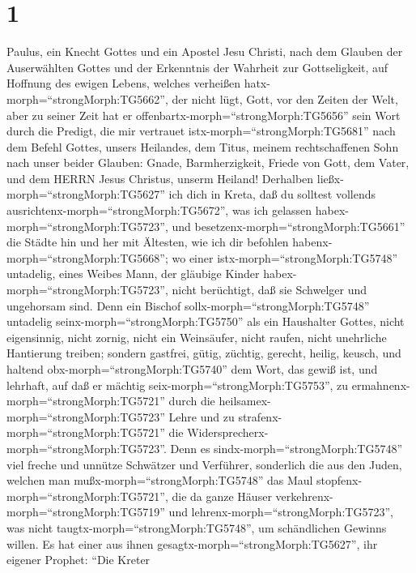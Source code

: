 \hypertarget{section}{%
\section{1}\label{section}}

 Paulus, ein Knecht Gottes und ein Apostel Jesu Christi,
nach dem Glauben der Auserwählten Gottes und der Erkenntnis der Wahrheit
zur Gottseligkeit,  auf Hoffnung des ewigen Lebens, welches
verheißen hatx-morph=``strongMorph:TG5662'', der nicht lügt, Gott, vor
den Zeiten der Welt,  aber zu seiner Zeit hat er
offenbartx-morph=``strongMorph:TG5656'' sein Wort durch die Predigt, die
mir vertrauet istx-morph=``strongMorph:TG5681'' nach dem Befehl Gottes,
unsers Heilandes,  dem Titus, meinem rechtschaffenen Sohn
nach unser beider Glauben: Gnade, Barmherzigkeit, Friede von Gott, dem
Vater, und dem HERRN Jesus Christus, unserm Heiland! 
Derhalben ließx-morph=``strongMorph:TG5627'' ich dich in Kreta, daß du
solltest vollends ausrichtenx-morph=``strongMorph:TG5672'', was ich
gelassen habex-morph=``strongMorph:TG5723'', und
besetzenx-morph=``strongMorph:TG5661'' die Städte hin und her mit
Ältesten, wie ich dir befohlen habenx-morph=``strongMorph:TG5668'';
 wo einer istx-morph=``strongMorph:TG5748'' untadelig, eines
Weibes Mann, der gläubige Kinder habex-morph=``strongMorph:TG5723'',
nicht berüchtigt, daß sie Schwelger und ungehorsam sind. 
Denn ein Bischof sollx-morph=``strongMorph:TG5748'' untadelig
seinx-morph=``strongMorph:TG5750'' als ein Haushalter Gottes, nicht
eigensinnig, nicht zornig, nicht ein Weinsäufer, nicht raufen, nicht
unehrliche Hantierung treiben;  sondern gastfrei, gütig,
züchtig, gerecht, heilig, keusch,  und haltend
obx-morph=``strongMorph:TG5740'' dem Wort, das gewiß ist, und lehrhaft,
auf daß er mächtig seix-morph=``strongMorph:TG5753'', zu
ermahnenx-morph=``strongMorph:TG5721'' durch die
heilsamex-morph=``strongMorph:TG5723'' Lehre und zu
strafenx-morph=``strongMorph:TG5721'' die
Widersprecherx-morph=``strongMorph:TG5723''.  Denn es
sindx-morph=``strongMorph:TG5748'' viel freche und unnütze Schwätzer und
Verführer, sonderlich die aus den Juden,  welchen man
mußx-morph=``strongMorph:TG5748'' das Maul
stopfenx-morph=``strongMorph:TG5721'', die da ganze Häuser
verkehrenx-morph=``strongMorph:TG5719'' und
lehrenx-morph=``strongMorph:TG5723'', was nicht
taugtx-morph=``strongMorph:TG5748'', um schändlichen Gewinns willen.
 Es hat einer aus ihnen
gesagtx-morph=``strongMorph:TG5627'', ihr eigener Prophet: ``Die Kreter
